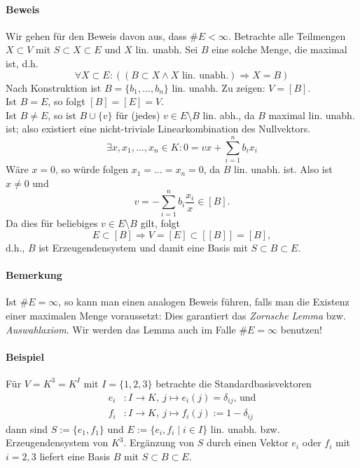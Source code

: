  	\paragraph{Beweis}
 		Wir gehen für den Beweis davon aus, dass $\#E<\infty$. Betrachte alle Teilmengen $X\subset V$ mit $S\subset X\subset E$ und $X$ lin. unabh. Sei $B$ eine solche Menge, die maximal ist, d.h.
 		\[
 			\forall X\subset E: ((B\subset X\land X\text{ lin. unabh.}) \Rightarrow X= B)
 		\]
 		Nach Konstruktion ist $B=\{b_1,...,b_n\}$ lin. unabh. Zu zeigen: $V=[B]$.\\
 		Ist $B=E$, so folgt $[B]=[E]=V$.\\
 		Ist $B\neq E$, so ist $B\cup \{v\} $ für (jedes) $v\in E\setminus B$ lin. abh., da $B$ maximal lin. unabh. ist; also existiert eine nicht-triviale Linearkombination des Nullvektors.
 		\[
 			\exists x,x_1,...,x_n \in K: 0=vx+\sum^n_{i=1}b_ix_i
 		\]
 		Wäre $x=0$, so würde folgen $x_1=...=x_n=0$, da $B$ lin. unabh. ist.
 		Also ist $x\neq 0$ und
 		\[
 			v=-\sum^n_{i=1} b_i\frac{x_i}{x} \in [B].
 		\]
 		Da dies für beliebiges $v\in E\setminus B$ gilt, folgt
 		\[
 			E\subset [B] \Rightarrow V=[E]\subset [[B]] = [B],
 		\]
 		d.h., $ B $ ist Erzeugendensystem und damit eine Basis mit $S\subset B\subset E$.

 	\paragraph{Bemerkung}
 		Ist $\#E = \infty$, so kann man einen analogen Beweis führen, falls man die Existenz einer maximalen Menge voraussetzt: Dies garantiert das \emph{Zornsche Lemma} bzw. \emph{Auswahlaxiom}.
 		Wir werden das Lemma auch im Falle $\#E = \infty$ benutzen!

 	\paragraph{Beispiel}
 		Für $V=K^3=K^I$ mit $I=\{1,2,3\}$ betrachte die Standardbasisvektoren
 		\begin{align*}
 			e_i & :I\to K,\ j\mapsto e_i(j) = \delta_{ij}\text{, und} \\
 			f_i & : I\to K,\ j\mapsto f_i(j):= 1-\delta_{ij}
 		\end{align*}
 		dann sind $S:= \{e_1,f_1\}$ und $E:= \{e_i,f_i\mid i\in I\}$ lin. unabh. bzw. Erzeugendensystem von $K^3$. Ergänzung von $S$ durch einen Vektor $e_i$ oder $f_i$ mit $i = 2,3$ liefert eine Basis $B$ mit $S\subset B\subset E$.

